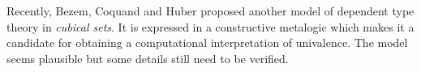 Recently, Bezem, Coquand and Huber \cite{bezem2013model} proposed another model of dependent type theory 
in \emph{cubical sets}. It is expressed in a constructive metalogic which makes it a candidate for obtaining a computational interpretation of univalence. The model seems plausible but some details still need to be verified.








